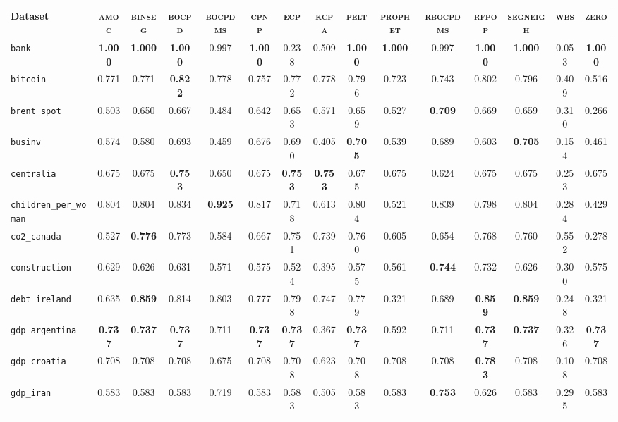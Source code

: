 \begin{tabular}{lcccccccccccccc}
Dataset & \textsc{amoc} & \textsc{binseg} & \textsc{bocpd} & \textsc{bocpdms} & \textsc{cpnp} & \textsc{ecp} & \textsc{kcpa} & \textsc{pelt} & \textsc{prophet} & \textsc{rbocpdms} & \textsc{rfpop} & \textsc{segneigh} & \textsc{wbs} & \textsc{zero}\\
\toprule
\verb+bank+ & \textbf{1.000} & \textbf{1.000} & \textbf{1.000} & 0.997 & \textbf{1.000} & 0.238 & 0.509 & \textbf{1.000} & \textbf{1.000} & 0.997 & \textbf{1.000} & \textbf{1.000} & 0.053 & \textbf{1.000}\\
\verb+bitcoin+ & 0.771 & 0.771 & \textbf{0.822} & 0.778 & 0.757 & 0.772 & 0.778 & 0.796 & 0.723 & 0.743 & 0.802 & 0.796 & 0.409 & 0.516\\
\verb+brent_spot+ & 0.503 & 0.650 & 0.667 & 0.484 & 0.642 & 0.653 & 0.571 & 0.659 & 0.527 & \textbf{0.709} & 0.669 & 0.659 & 0.310 & 0.266\\
\verb+businv+ & 0.574 & 0.580 & 0.693 & 0.459 & 0.676 & 0.690 & 0.405 & \textbf{0.705} & 0.539 & 0.689 & 0.603 & \textbf{0.705} & 0.154 & 0.461\\
\verb+centralia+ & 0.675 & 0.675 & \textbf{0.753} & 0.650 & 0.675 & \textbf{0.753} & \textbf{0.753} & 0.675 & 0.675 & 0.624 & 0.675 & 0.675 & 0.253 & 0.675\\
\verb+children_per_woman+ & 0.804 & 0.804 & 0.834 & \textbf{0.925} & 0.817 & 0.718 & 0.613 & 0.804 & 0.521 & 0.839 & 0.798 & 0.804 & 0.284 & 0.429\\
\verb+co2_canada+ & 0.527 & \textbf{0.776} & 0.773 & 0.584 & 0.667 & 0.751 & 0.739 & 0.760 & 0.605 & 0.654 & 0.768 & 0.760 & 0.552 & 0.278\\
\verb+construction+ & 0.629 & 0.626 & 0.631 & 0.571 & 0.575 & 0.524 & 0.395 & 0.575 & 0.561 & \textbf{0.744} & 0.732 & 0.626 & 0.300 & 0.575\\
\verb+debt_ireland+ & 0.635 & \textbf{0.859} & 0.814 & 0.803 & 0.777 & 0.798 & 0.747 & 0.779 & 0.321 & 0.689 & \textbf{0.859} & \textbf{0.859} & 0.248 & 0.321\\
\verb+gdp_argentina+ & \textbf{0.737} & \textbf{0.737} & \textbf{0.737} & 0.711 & \textbf{0.737} & \textbf{0.737} & 0.367 & \textbf{0.737} & 0.592 & 0.711 & \textbf{0.737} & \textbf{0.737} & 0.326 & \textbf{0.737}\\
\verb+gdp_croatia+ & 0.708 & 0.708 & 0.708 & 0.675 & 0.708 & 0.708 & 0.623 & 0.708 & 0.708 & 0.708 & \textbf{0.783} & 0.708 & 0.108 & 0.708\\
\verb+gdp_iran+ & 0.583 & 0.583 & 0.583 & 0.719 & 0.583 & 0.583 & 0.505 & 0.583 & 0.583 & \textbf{0.753} & 0.626 & 0.583 & 0.295 & 0.583\\

\end{tabular}
